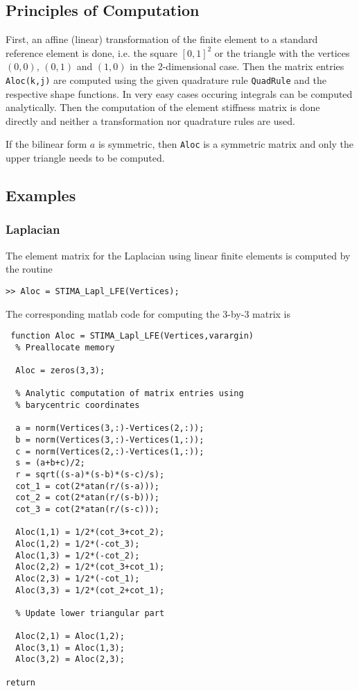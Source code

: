 \subsection{Principles of Computation}

 First, an affine (linear) transformation of the finite element to a standard reference element is done, i.e. the square $[0,1]^2$ or the triangle with the vertices $(0,0)$, $(0,1)$ and $(1,0)$ in the 2-dimensional case. Then the matrix entries {\tt Aloc(k,j)} are computed using the given quadrature rule {\tt QuadRule} and the respective shape functions. In very easy cases occuring integrals can be computed analytically. Then the computation of the element stiffness matrix is done directly and neither a transformation nor quadrature rules are used.

 If the bilinear form $a$ is symmetric, then {\tt Aloc} is a symmetric matrix and only the upper triangle needs to be computed.
 

\subsection{Examples} 


\subsubsection{Laplacian} 

The element matrix for the Laplacian using linear finite elements is computed by the routine

\noindent \verb!>> Aloc = STIMA_Lapl_LFE(Vertices);!

The corresponding matlab code for computing the $3$-by-$3$ matrix is

\begin{lstlisting}
 function Aloc = STIMA_Lapl_LFE(Vertices,varargin)
  % Preallocate memory
  
  Aloc = zeros(3,3);

  % Analytic computation of matrix entries using
  % barycentric coordinates
  
  a = norm(Vertices(3,:)-Vertices(2,:)); 
  b = norm(Vertices(3,:)-Vertices(1,:));
  c = norm(Vertices(2,:)-Vertices(1,:));
  s = (a+b+c)/2;
  r = sqrt((s-a)*(s-b)*(s-c)/s);
  cot_1 = cot(2*atan(r/(s-a)));
  cot_2 = cot(2*atan(r/(s-b)));
  cot_3 = cot(2*atan(r/(s-c)));
  
  Aloc(1,1) = 1/2*(cot_3+cot_2);
  Aloc(1,2) = 1/2*(-cot_3);
  Aloc(1,3) = 1/2*(-cot_2);
  Aloc(2,2) = 1/2*(cot_3+cot_1);
  Aloc(2,3) = 1/2*(-cot_1);
  Aloc(3,3) = 1/2*(cot_2+cot_1);
  
  % Update lower triangular part
  
  Aloc(2,1) = Aloc(1,2);
  Aloc(3,1) = Aloc(1,3);
  Aloc(3,2) = Aloc(2,3);

return
\end{lstlisting}


